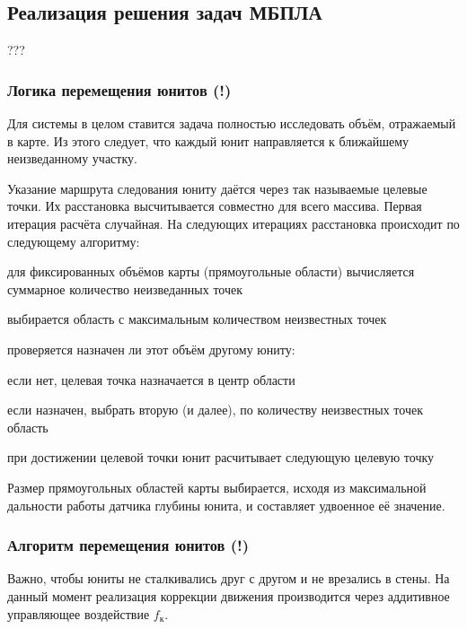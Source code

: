\subsection{Реализация решения задач МБПЛА}

???

\newpage
\subsubsection{Логика перемещения юнитов (!)}

Для системы в целом ставится задача полностью исследовать объём, отражаемый в карте.
Из этого следует, что каждый юнит направляется к ближайшему неизведанному участку.

Указание маршрута следования юниту даётся через так называемые целевые точки.
Их расстановка высчитывается совместно для всего массива. Первая итерация расчёта
случайная. На следующих итерациях расстановка происходит по следующему алгоритму:
\begin{mintemize}
\item для фиксированных объёмов карты (прямоугольные области) вычисляется суммарное
    количество неизведанных точек
\item выбирается область с максимальным количеством неизвестных точек
\item проверяется назначен ли этот объём другому юниту:
    \begin{mintemize}
        \item если нет, целевая точка назначается в центр области
        \item если назначен, выбрать вторую (и далее), по количеству неизвестных точек область
    \end{mintemize}
\item при достижении целевой точки юнит расчитывает следующую целевую точку
\end{mintemize}

Размер прямоугольных областей карты выбирается, исходя из максимальной дальности работы
датчика глубины юнита, и составляет удвоенное её значение.

\newpage
\subsubsection{Алгоритм перемещения юнитов (!)}

Важно, чтобы юниты не сталкивались друг с другом и не врезались в стены.
На данный момент реализация коррекции движения производится через аддитивное управляющее
воздействие $f_{\text{к}}$. 


